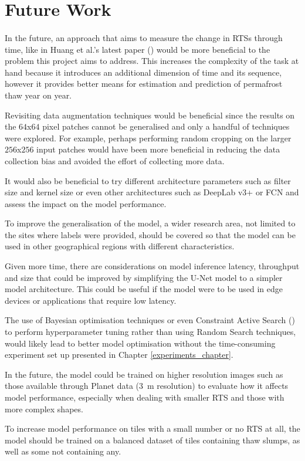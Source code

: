 \section{Future Work}
\paragraph{}
In the future, an approach that aims to measure the change in \gls{RTS}s through time, like in Huang et al.'s latest paper (\cite{HUANG2021102399}) would be more beneficial to the problem this project aims to address. This increases the complexity of the task at hand because it introduces an additional dimension of time and its sequence, however it provides better means for estimation and prediction of permafrost thaw year on year.

Revisiting data augmentation techniques would be beneficial since the results on the $64$x$64$ pixel patches cannot be generalised and only a handful of techniques were explored. For example, perhaps performing random cropping on the larger $256$x$256$ input patches would have been more beneficial in reducing the data collection bias and avoided the effort of collecting more data.

It would also be beneficial to try different architecture parameters such as filter size and kernel size or even other architectures such as DeepLab v3+ or \gls{FCN} and assess the impact on the model performance.

To improve the generalisation of the model, a wider research area, not limited to the sites where labels were provided, should be covered so that the model can be used in other geographical regions with different characteristics.

Given more time, there are considerations on model inference latency, throughput and size that could be improved by simplifying the U-Net model to a simpler model architecture. This could be useful if the model were to be used in edge devices or applications that require low latency.

The use of Bayesian optimisation techniques or even Constraint Active Search (\cite{pmlr-v139-malkomes21a}) to perform hyperparameter tuning rather than using Random Search techniques, would likely lead to better model optimisation without the time-consuming experiment set up presented in Chapter \ref{experiments_chapter}.

In the future, the model could be trained on higher resolution images such as those available through Planet data (\SI{3}{\metre} resolution) to evaluate how it affects model performance, especially when dealing with smaller \gls{RTS} and those with more complex shapes.

To increase model performance on tiles with a small number or no \gls{RTS} at all, the model should be trained on a balanced dataset of tiles containing thaw slumps, as well as some not containing any.